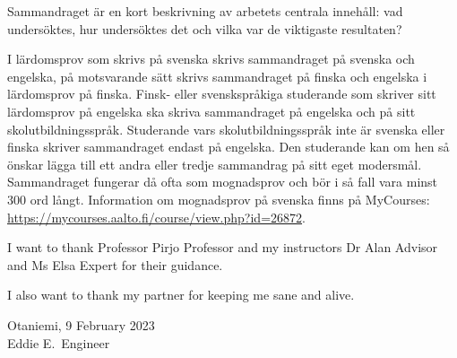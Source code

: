 \documentclass[english, 12pt, a4paper, elec, utf8, a-2b, online]{aaltothesis}
\begin{document}
\begin{abstractpage}[swedish]
Sammandraget är en kort beskrivning av arbetets centrala innehåll: vad 
undersöktes, hur undersöktes det och vilka var de viktigaste resultaten?

I lärdomsprov som skrivs på svenska skrivs sammandraget på svenska och engelska, 
på motsvarande sätt skrivs sammandraget på finska och engelska i lärdomsprov på 
finska. Finsk- eller svenskspråkiga studerande som skriver sitt lärdomsprov på 
engelska ska skriva sammandraget på engelska och på sitt skolutbildningsspråk. 
Studerande vars skolutbildningsspråk inte är svenska eller finska skriver 
sammandraget endast på engelska. Den studerande kan om hen så önskar lägga till 
ett andra eller tredje sammandrag på sitt eget modersmål. Sammandraget fungerar 
då ofta som mognadsprov och bör i så fall vara minst 300 ord långt. Information 
om mognadsprov på svenska finns på MyCourses:\\
\url{https://mycourses.aalto.fi/course/view.php?id=26872}.
\end{abstractpage}


\dothesispagenumbering{}

I want to thank Professor Pirjo Professor and my instructors Dr Alan Advisor and
Ms Elsa Expert for their guidance.

I also want to thank my partner for keeping me sane and alive.

\vspace{5cm}
Otaniemi, 9 February 2023\\

\vspace{5mm}
{\hfill Eddie E.\ Engineer \hspace{1cm}}

\newpage


\thesistableofcontents
\end{document}
